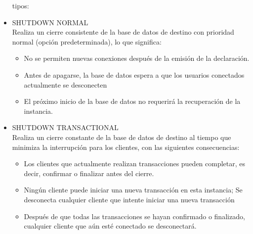 \begin{itemize}
tipos:

\item SHUTDOWN NORMAL
	\\Realiza un cierre consistente de la base de datos de destino con prioridad normal (opción predeterminada), lo que significa:
		
		\begin{itemize}
			\item No se permiten nuevas conexiones después de la emisión de la declaración.
			\item Antes de apagarse, la base de datos espera a que los usuarios conectados actualmente se desconecten
			\item El próximo inicio de la base de datos no requerirá la recuperación de la instancia.
			
		\end{itemize}


\item SHUTDOWN TRANSACTIONAL
	\\Realiza un cierre constante de la base de datos de destino al tiempo que minimiza la interrupción para los clientes, con las siguientes consecuencias:
		
		\begin{itemize}
			\item Los clientes que actualmente realizan transacciones pueden completar, es decir, confirmar o finalizar antes del cierre.
			\item Ningún cliente puede iniciar una nueva transacción en esta instancia; Se desconecta cualquier cliente que intente iniciar una nueva transacción
			\item Después de que todas las transacciones se hayan confirmado o finalizado, cualquier cliente que aún esté conectado se desconectará.
			
		\end{itemize}



\end{itemize}
